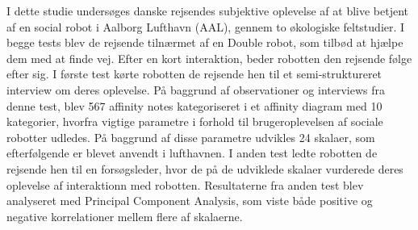 I dette studie undersøges danske rejsendes subjektive oplevelse af at blive betjent af en social robot i Aalborg Lufthavn (AAL), gennem to økologiske feltstudier. I begge tests blev de rejsende tilnærmet af en Double robot, som tilbød at hjælpe dem med at finde vej. Efter en kort interaktion, beder robotten den rejsende følge efter sig. I første test kørte robotten de rejsende hen til et semi-struktureret interview om deres oplevelse. På baggrund af observationer og interviews fra denne test, blev 567 affinity notes kategoriseret i et affinity diagram med 10 kategorier, hvorfra vigtige parametre i forhold til brugeroplevelsen af sociale robotter udledes. På baggrund af disse parametre udvikles 24 skalaer, som efterfølgende er blevet anvendt i lufthavnen. I anden test ledte robotten de rejsende hen til en forsøgsleder, hvor de på de udviklede skalaer vurderede deres oplevelse af interaktionn med robotten. Resultaterne fra anden test blev analyseret med Principal Component Analysis, som viste både positive og negative korrelationer mellem flere af skalaerne.